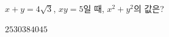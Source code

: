 $x+y=4\sqrt{3}$, $xy=5$일 때, $x^2+y^2$의 값은?
\begin{choices32}{$25$}{$30$}{$38$}{$40$}{$45$}\end{choices32}
